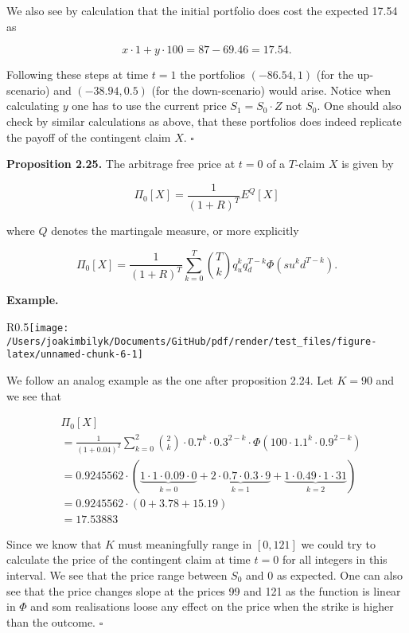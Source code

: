 \documentclass[
]{article}
\begin{document}
We also see by calculation that the initial portfolio does cost the
expected 17.54 as

\[
x\cdot 1+y\cdot100=87-69.46=17.54.
\]

Following these steps at time \(t=1\) the portfolios \((-86.54,1)\) (for
the up-scenario) and \((-38.94,0.5)\) (for the down-scenario) would
arise. Notice when calculating \(y\) one has to use the current price
\(S_1=S_0\cdot Z\) not \(S_0\). One should also check by similar
calculations as above, that these portfolios does indeed replicate the
payoff of the contingent claim \(X\). \(\square\)

\textbf{Proposition 2.25.} The arbitrage free price at \(t=0\) of a
\(T\)-claim \(X\) is given by

\[
\Pi_0[X]=\frac{1}{(1+R)^T}E^Q[X]
\]

where \(Q\) denotes the martingale measure, or more explicitly

\[
\Pi_0[X]=\frac{1}{(1+R)^T}\sum_{k=0}^T\binom{T}{k}q_u^kq_d^{T-k}\Phi(su^kd^{T-k}).
\]

\textbf{Example.}

\begin{wrapfigure}{R}{0.5\textwidth}\texttt{[image: /Users/joakimbilyk/Documents/GitHub/pdf/render/test\_files/figure-latex/unnamed-chunk-6-1]}\end{wrapfigure}

We follow an analog example as the one after proposition 2.24. Let
\(K=90\) and we see that

\begin{align*}
&\Pi_0[X]\\
&=\frac{1}{(1+0.04)^2}\sum_{k=0}^2\binom{2}{k}\cdot0.7^k\cdot0.3^{2-k}\cdot\Phi(100\cdot 1.1^k\cdot0.9^{2-k})\\
&=0.9245562\cdot\left(\underbrace{1\cdot 1\cdot0.09\cdot0}_{k=0}+\underbrace{2\cdot 0.7\cdot0.
3\cdot 9}_{k=1}+\underbrace{1\cdot 0.49\cdot1\cdot31}_{k=2}\right)\\
&=0.9245562\cdot\left(0+3.78+15.19\right)\\
&=17.53883
\end{align*}

Since we know that \(K\) must meaningfully range in \([0,121]\) we could
try to calculate the price of the contingent claim at time \(t=0\) for
all integers in this interval. We see that the price range between
\(S_0\) and 0 as expected. One can also see that the price changes slope
at the prices 99 and 121 as the function is linear in \(\Phi\) and som
realisations loose any effect on the price when the strike is higher
than the outcome. \(\square\)
\end{document}
